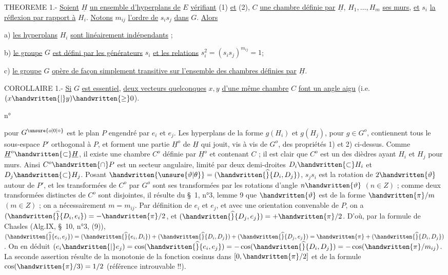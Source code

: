 THEOREME 1.- \uline{Soient} $\underline{H}$ \uline{un ensemble d'hyperplans de} $E$ \uline{vérifiant} (1) \uline{et} (2), $C$ \uline{une chambre définie par} $\underline{H}$, $H_1,\ldots,H_m$ \uline{ses murs}, \uline{et} $s_i$ \uline{la réflexion par rapport à} $H_i$. \uline{Notons} $m_{ij}$ \uline{l'ordre de} $s_i s_j$ \uline{dans} $G$. \uline{Alors}

a) \uline{les hyperplans} $H_i$ \uline{sont linéairement indépendants} ;

b) \uline{le groupe} $G$ \uline{est défini par les générateurs} $s_i$ \uline{et les relations} $s_i^2=(s_i s_j)^{m_{ij}}=1$;

c) \uline{le groupe} $G$ \uline{opère de façon simplement transitive sur l'ensemble des chambres définies par} $\underline{H}$.

COROLLAIRE 1.- \uline{Si} $G$ \uline{est essentiel}, \uline{deux vecteurs quelconques} $x,y$ \uline{d'une même chambre} $C$ \uline{font un angle aigu} (i.e. $(x\handwritten{|}y)\handwritten{\geq}0$).

\begin{flushright}n°\end{flushright}
pour $G^{\unsure{o|0|\circ}}$ est le plan $P$ engendré par $e_i$ et $e_j$. Les hyperplans de la forme $g(H_i)$ et $g(H_j)$, pour $g\in G^o$, contiennent tous le sous-espace $P'$ orthogonal à $P$, et forment une partie $\underline{H}^o$ de $\underline{H}$ qui jouit, vis à vis de $G^o$, des propriétés 1) et 2) ci-dessus. Comme $\underline{H}^o\handwritten{\subset}\underline{H}$, il existe une chambre $C^o$ définie par $\underline{H}^o$ et contenant $C$ ; il est clair que $C^o$ est un des dièdres ayant $H_i$ et $H_j$ pour murs. Ainsi $C^o\handwritten{\cap}P$ est un secteur angulaire, limité par deux demi-droites $D_i\handwritten{\subset}H_i$ et $D_j\handwritten{\subset}H_j$. Posant $\handwritten{\unsure{\vartheta|\theta}}=(\handwritten{\widehat}{D_i,D_j})$, $s_j s_i$ est la rotation de $2\handwritten{\vartheta}$ autour de $P'$, et les transformées de $C^o$ par $G^o$ sont ses transformées par les rotations d'angle $n\handwritten{\vartheta}$ $(n\in Z)$ ; comme deux transformées distinctes de $C^o$ sont disjointes, il résulte du \S\ 1, n°3, lemme 9 que $\handwritten{\vartheta}$ est de la forme $\handwritten{\pi}/m$ $(m\in Z)$ ; on a nécessairement $m=m_{ij}$. Par définition de $e_i$ et $e_j$, et avec une orientation convenable de $P$, on a $(\handwritten{\widehat}{D_i,e_i})=-\handwritten{\pi}/2$, et $(\handwritten{\widehat}{D_j,e_j})=+\handwritten{\pi}/2$. D'où, par la formule de Chasles (Alg.IX, \S\ 10, n°3, (9)), $(\handwritten{\widehat}{e_i,e_j})=(\handwritten{\widehat}{e_i,D_i})+(\handwritten{\widehat}{D_i,D_j})+(\handwritten{\widehat}{D_j,e_j})=\handwritten{\pi}+(\handwritten{\widehat}{D_i,D_j})$. On en déduit $(e_i\handwritten{|}e_j)=\cos(\handwritten{\widehat}{e_i,e_j})=-\cos(\handwritten{\widehat}{D_i,D_j})=-\cos(\handwritten{\pi}/m_{ij})$. La seconde assertion résulte de la monotonie de la fonction cosinus dans $[0,\handwritten{\pi}/2]$ et de la formule $\cos(\handwritten{\pi}/3)=1/2$ (référence introuvable !!).

